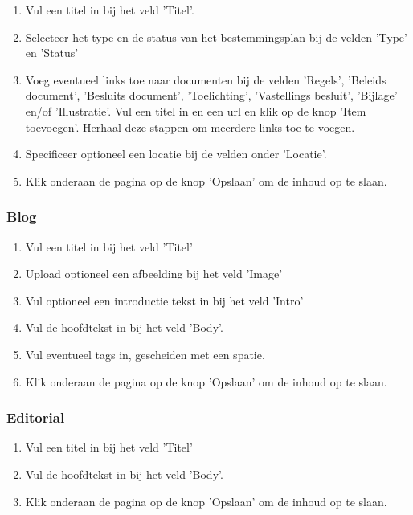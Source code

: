 \begin{enumerate}
\item Vul een titel in bij het veld 'Titel'.
\item Selecteer het type en de status van het bestemmingsplan bij de velden 'Type' en 'Status'
\item Voeg eventueel links toe naar documenten bij de velden 'Regels', 'Beleids document', 'Besluits document', 'Toelichting', 'Vastellings besluit', 'Bijlage' en/of 'Illustratie'. Vul een titel in en een url en klik op de knop 'Item toevoegen'. Herhaal deze stappen om meerdere links toe te voegen. 
\item Specificeer optioneel een locatie bij de velden onder 'Locatie'.
\item Klik onderaan de pagina op de knop 'Opslaan' om de inhoud op te slaan.
\end{enumerate}

\subsubsection{Blog}\label{blog}

\begin{enumerate}
\item Vul een titel in bij het veld 'Titel'
\item Upload optioneel een afbeelding bij het veld 'Image'
\item Vul optioneel een introductie tekst in bij het veld 'Intro'
\item Vul de hoofdtekst in bij het veld 'Body'.
\item Vul eventueel tags in, gescheiden met een spatie.
\item Klik onderaan de pagina op de knop 'Opslaan' om de inhoud op te slaan.
\end{enumerate}

\subsubsection{Editorial}\label{editorial}

\begin{enumerate}
\item Vul een titel in bij het veld 'Titel'
\item Vul de hoofdtekst in bij het veld 'Body'.
\item Klik onderaan de pagina op de knop 'Opslaan' om de inhoud op te slaan.
\end{enumerate}

